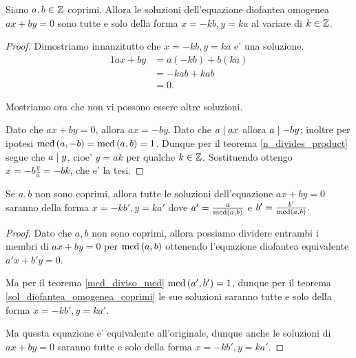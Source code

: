 \begin{theorem} \label{sol_diofantea_omogenea_coprimi}
    Siano $a, b \in \mathbb{Z}$ coprimi. Allora le soluzioni dell'equazione diofantea omogenea $ax + by = 0$ sono tutte e solo della forma $x = -kb, y = ka$ al variare di $k \in \mathbb{Z}$.
\end{theorem}
\begin{proof}
    Dimostriamo innanzitutto che $x = -kb, y = ka$ e' una soluzione.
    \begin{alignat*}{1}
        ax + by &= a(-kb) + b(ka)\\
                &= -kab + kab\\
                &= 0.
    \end{alignat*}

    Mostriamo ora che non vi possono essere altre soluzioni. 
    
    Dato che $ax + by = 0$, allora $ax = -by$.
    Dato che $a \mid ax$ allora $a \mid -by$; inoltre per ipotesi $\operatorname{mcd}\left(a, -b\right) = \operatorname{mcd}\left(a, b\right) = 1$.
    Dunque per il teorema \ref{n_divides_product} segue che $a \mid y$, cioe' $y = ak$ per qualche $k \in \mathbb{Z}$. Sostituendo ottengo $x = -b\frac{y}{a} = -bk$, che e' la tesi.
\end{proof}

\begin{corollary} \label{sol_diofantea_omogenea}
    Se $a, b$ non sono coprimi, allora tutte le soluzioni dell'equazione $ax + by = 0$ saranno della forma $x = -kb', y = ka'$ dove $a' = \frac{a}{\operatorname{mcd}\left(a, b\right)}$ e $b' = \frac{b'}{\operatorname{mcd}\left(a, b\right)}.$
\end{corollary}
\begin{proof}
    Dato che $a, b$ non sono coprimi, allora possiamo dividere entrambi i membri di $ax + by = 0$ per $\operatorname{mcd}\left(a, b\right)$ ottenendo l'equazione diofantea equivalente $a'x + b'y = 0$. 
    
    Ma per il teorema \ref{mcd_diviso_mcd} $\operatorname{mcd}\left(a', b'\right) = 1$, dunque per il teorema \ref{sol_diofantea_omogenea_coprimi} le sue soluzioni saranno tutte e solo della forma $x = -kb', y = ka'$. 
    
    Ma questa equazione e' equivalente all'originale, dunque anche le soluzioni di $ax + by = 0$ saranno tutte e solo della forma $x = -kb', y = ka'$.
\end{proof}

